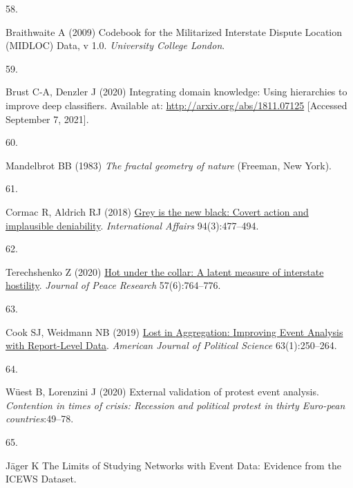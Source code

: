 \documentclass{article}
\newlength{\cslhangindent}
\newlength{\csllabelwidth}
\newlength{\cslentryspacingunit} %
\newenvironment{CSLReferences}[2] %
 {%
  \setlength{\parindent}{0pt}
  \ifodd #1
  \let\oldpar\par
  \def\par{\hangindent=\cslhangindent\oldpar}
  \fi
  \setlength{\parskip}{#2\cslentryspacingunit}
 }%
 {}
\newcommand{\CSLLeftMargin}[1]{\parbox[t]{\csllabelwidth}{#1}}
\newcommand{\CSLRightInline}[1]{\parbox[t]{\linewidth - \csllabelwidth}{#1}\break}
\begin{document}
\begin{CSLReferences}{0}{0}
\leavevmode{}%
\CSLLeftMargin{58. }%
\CSLRightInline{Braithwaite A (2009) Codebook for the {Militarized
Interstate Dispute Location} ({MIDLOC}) {Data}, v 1.0. \emph{University
College London}.}

\leavevmode{}%
\CSLLeftMargin{59. }%
\CSLRightInline{Brust C-A, Denzler J (2020) Integrating domain
knowledge: Using hierarchies to improve deep classifiers. Available at:
\url{http://arxiv.org/abs/1811.07125} {[}Accessed September 7, 2021{]}.}

\leavevmode{}%
\CSLLeftMargin{60. }%
\CSLRightInline{Mandelbrot BB (1983) \emph{The fractal geometry of
nature} ({Freeman}, {New York}).}

\leavevmode{}%
\CSLLeftMargin{61. }%
\CSLRightInline{Cormac R, Aldrich RJ (2018)
\href{https://doi.org/10.1093/ia/iiy067}{Grey is the new black: Covert
action and implausible deniability}. \emph{International Affairs}
94(3):477--494.}

\leavevmode{}%
\CSLLeftMargin{62. }%
\CSLRightInline{Terechshenko Z (2020)
\href{https://doi.org/10.1177/0022343320962546}{Hot under the collar:
{A} latent measure of interstate hostility}. \emph{Journal of Peace
Research} 57(6):764--776.}

\leavevmode{}%
\CSLLeftMargin{63. }%
\CSLRightInline{Cook SJ, Weidmann NB (2019)
\href{https://doi.org/10.1111/ajps.12398}{Lost in {Aggregation}:
{Improving Event Analysis} with {Report-Level Data}}. \emph{American
Journal of Political Science} 63(1):250--264.}

\leavevmode{}%
\CSLLeftMargin{64. }%
\CSLRightInline{Wüest B, Lorenzini J (2020) External validation of
protest event analysis. \emph{Contention in times of crisis: Recession
and political protest in thirty Euro-pean countries}:49--78.}

\leavevmode{}%
\CSLLeftMargin{65. }%
\CSLRightInline{Jäger K The {Limits} of {Studying Networks} with {Event
Data}: {Evidence} from the {ICEWS Dataset}.}

\end{CSLReferences}



\end{document}
